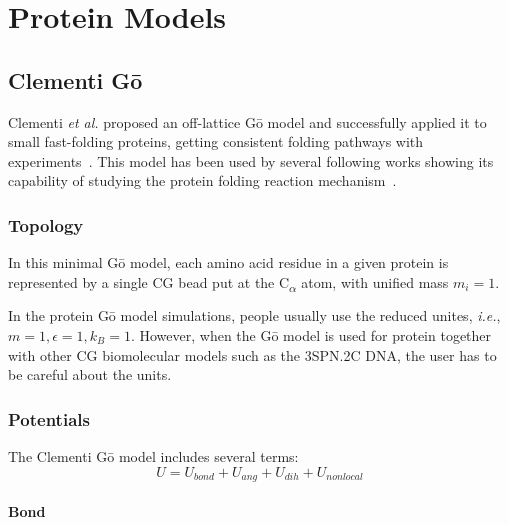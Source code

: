 \chapter{Protein Models}
\label{chap:protein}


\section{Clementi G\={o}}
\label{sec:protein_cc_go}

Clementi \emph{et al.} proposed an off-lattice G\={o} model and successfully
applied it to small fast-folding proteins, getting consistent folding pathways
with experiments~\cite{Clementi2000}.  This model has been used by several
following works showing its capability of studying the protein folding reaction
mechanism~\cite{Hoang2000, Koga2001}.

\subsection{Topology}
\label{subsec:protein_cc_go_top}

In this minimal G\={o} model, each amino acid residue in a given protein is
represented by a single CG bead put at the C\textsubscript{$\alpha$} atom, with
unified mass $m_{i} = 1$.

\note{} In the protein G\={o} model simulations, people usually use the reduced
unites, \emph{i.e.}, $m=1, \epsilon=1, k_B=1$.  However, when the G\={o} model
is used for protein together with other CG biomolecular models such as the
3SPN.2C DNA, the user has to be careful about the units.

\subsection{Potentials}
\label{subsec:protein_cc_go_potential}

The Clementi G\={o} model includes several terms:
\begin{equation}
  \label{eq:protein_cc_go_all}
  U = U_{bond} + U_{ang} + U_{dih} + U_{nonlocal}
\end{equation}

\subsubsection{Bond}
\label{sec:protein_cc_go_potential_bond}

